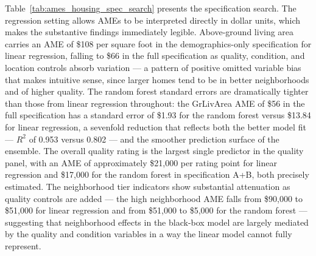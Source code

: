\documentclass[12pt]{article}
\begin{document}
	Table~\ref{tab:ames_housing_spec_search} presents the specification search. The regression setting allows AMEs to be interpreted directly in dollar units, which makes the substantive findings immediately legible. Above-ground living area carries an AME of \$108 per square foot in the demographics-only specification for linear regression, falling to \$66 in the full specification as quality, condition, and location controls absorb variation --- a pattern of positive omitted variable bias that makes intuitive sense, since larger homes tend to be in better neighborhoods and of higher quality. The random forest standard errors are dramatically tighter than those from linear regression throughout: the GrLivArea AME of \$56 in the full specification has a standard error of \$1.93 for the random forest versus \$13.84 for linear regression, a sevenfold reduction that reflects both the better model fit --- $R^2$ of 0.953 versus 0.802 --- and the smoother prediction surface of the ensemble. The overall quality rating is the largest single predictor in the quality panel, with an AME of approximately \$21,000 per rating point for linear regression and \$17,000 for the random forest in specification A+B, both precisely estimated. The neighborhood tier indicators show substantial attenuation as quality controls are added --- the high neighborhood AME falls from \$90,000 to \$51,000 for linear regression and from \$51,000 to \$5,000 for the random forest --- suggesting that neighborhood effects in the black-box model are largely mediated by the quality and condition variables in a way the linear model cannot fully represent.
	
\end{document}
